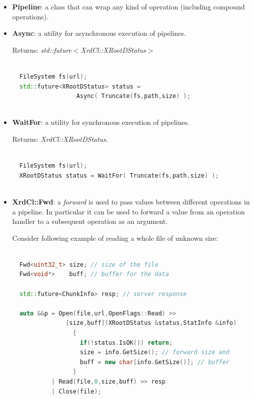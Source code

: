 \documentclass{article}
\begin{document}
		\begin{itemize}
		  
		  \item \textbf{Pipeline}: a class that can wrap any kind of operation (including compound operations).
		  
		  \item \textbf{Async}: a utility for asynchronous execution of pipelines. 
		  
		  		Returns: \textit{std::future$<$XrdCl::XRootDStatus$>$}
		  		
\begin{lstlisting}[language=C++, xleftmargin=\dimexpr-\leftmargini]

  FileSystem fs(url);
  std::future<XRootDStatus> status = 
                  Async( Truncate(fs,path,size) );
  
\end{lstlisting}
		  
		  \item \textbf{WaitFor}: a utility for synchronous execution of pipelines. 
		  		
		  		Returns: \textit{XrdCl::XRootDStatus}.
		  		
\begin{lstlisting}[language=C++, xleftmargin=\dimexpr-\leftmargini]

  FileSystem fs(url);
  XRootDStatus status = WaitFor( Truncate(fs,path,size) );
  
\end{lstlisting}
		  
		  \item \textbf{XrdCl::Fwd}: a \textit{forward} is used to pass values between different operations in a pipeline. In particular it can
		  		be used to forward a value from an operation handler to a subsequent operation as an argument.
	
		  		Consider following example of reading a whole file of unknown size:

\begin{lstlisting}[language=C++, xleftmargin=\dimexpr-\leftmargini]
		
  Fwd<uint32_t> size; // size of the file
  Fwd<void*>    buff; // buffer for the data
  
  std::future<ChunkInfo> resp; // server response

  auto &&p = Open(file,url,OpenFlags::Read) >> 
               [size,buff](XRootDStatus &status,StatInfo &info)
                 {
                   if(!status.IsOK()) return;
                   size = info.GetSize(); // forward size and
                   buff = new char[info.GetSize()]; // buffer
                 }
           | Read(file,0,size,buff) >> resp 
           | Close(file);


\end{lstlisting}
\end{itemize}
\end{document}
